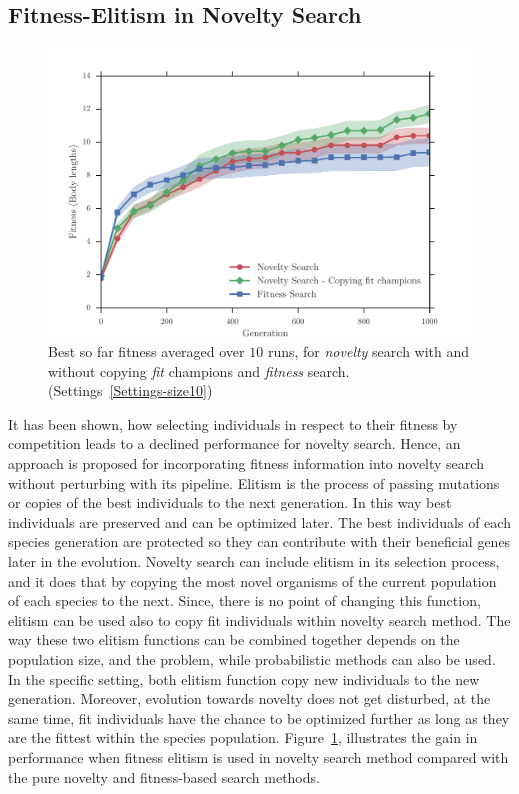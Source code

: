 \subsection*{Fitness-Elitism in Novelty Search}

\begin{figure}[t!]
\centering
\includegraphics[width=1.0\textwidth]{../Figures/Results/CopyFitChampions10.pdf}
\caption{Best so far fitness averaged over $10$ runs, for \emph{novelty} search with and without copying \emph{fit} champions and \emph{fitness} search. (Settings~\ref{Settings-size10})}
\label{fig:CopyFitChampions10}
\end{figure}

It has been shown, how selecting individuals in respect to their fitness by competition leads to a declined performance for novelty search. Hence, an approach is proposed for incorporating fitness information into novelty search without perturbing with its pipeline. Elitism is the process of passing mutations or copies of the best individuals to the next generation. In this way best individuals are preserved and can be optimized later. The best individuals of each species generation are protected so they can contribute with their beneficial genes later in the evolution. Novelty search can include elitism in its selection process, and it does that by copying the most novel organisms of the current population of each species to the next. Since, there is no point of changing this function, elitism can be used also to copy fit individuals within novelty search method. The way these two elitism functions can be combined together depends on the population size, and the problem, while probabilistic methods can also be used. In the specific setting, both elitism function copy new individuals to the new generation. Moreover, evolution towards novelty does not get disturbed, at the same time, fit individuals have the chance to be optimized further as long as they are the fittest within the species population. Figure~\ref{fig:CopyFitChampions10}, illustrates the gain in performance when fitness elitism is used in novelty search method compared with the pure novelty and fitness-based search methods.




